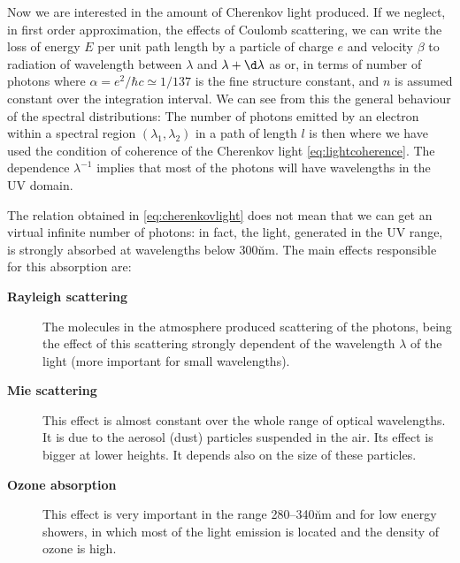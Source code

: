 Now we are interested in the amount of Cherenkov light produced. If we
neglect, in first order approximation, the effects of Coulomb
scattering, we can write the loss of energy $E$ per unit path length
by a particle of charge $e$ and velocity $\beta$ to \Cherenkov
radiation of wavelength between $\lambda$ and $\lambda+\d \lambda$ as
%
\dEdheq
%
or, in terms of number of photons
%
\dNdheq
%
where $\alpha = e^2/\hbar c \simeq 1/137$ is the fine structure
constant, and $n$ is assumed constant over the integration interval.
We can see from this the general behaviour of the spectral
distributions:
%
\specdistreq
%
The number of photons emitted by an electron within a spectral region
$(\lambda_1,\lambda_2)$ in a path of length $l$ is then
%
\phemiteq
%
where we have used the condition of coherence of the Cherenkov light
\eqref{eq:lightcoherence}. The dependence $\lambda^{-1}$ implies that
most of the photons will have wavelengths in the UV domain.

The relation obtained in \eqref{eq:cherenkovlight} does not mean that
we can get an virtual infinite number of \Cherenkov photons: in fact,
the \Cherenkov light, generated in the UV range, is strongly absorbed
at wavelengths below 300\u{nm}. The main effects responsible for this
absorption are:

\begin{description}
  
\item[\textbf{Rayleigh scattering}] The molecules in the atmosphere
  produced scattering of the photons, being the effect of this
  scattering strongly dependent of the wavelength $\lambda$ of the
  light (more important for small wavelengths).
  
\item[\textbf{Mie scattering}] This effect is almost constant over the
  whole range of optical wavelengths. It is due to the aerosol (dust)
  particles suspended in the air. Its effect is bigger at lower
  heights. It depends also on the size of these particles.
  
\item[\textbf{Ozone absorption}] This effect is very important in the
  range 280--340\u{nm} and for low energy showers, in which most of
  the \Cherenkov light emission is located and the density of ozone is
  high.

\end{description}


